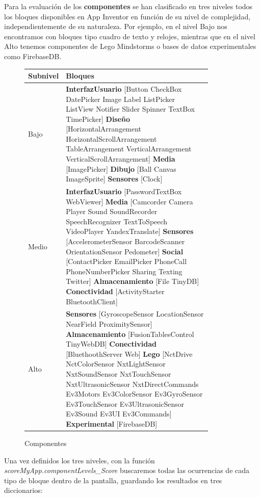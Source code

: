 \documentclass[a4paper, 12pt]{book}
\begin{document}
Para la evaluación de los \textbf{componentes} se han clasificado en tres niveles todos los bloques disponibles en App Inventor en función de su nivel de complejidad, independientemente de su naturaleza. Por ejemplo, en el nivel Bajo nos encontramos con bloques tipo cuadro de texto y relojes, mientras que en el nivel Alto tenemos componentes de Lego Mindstorms o bases de datos experimentales como FirebaseDB. 
\begin{figure}
	\begin{center}
	    \begin{tabular}{| l | p{0.85\linewidth} | }
	    \hline
	    \textbf{Subnivel} & \textbf{Bloques} \\ \hline
		Bajo & \textbf{InterfazUsuario} [Button CheckBox DatePicker Image Label ListPicker ListView Notifier Slider Spinner TextBox TimePicker] \textbf{Diseño} [HorizontalArrangement HorizontalScrollArrangement TableArrangement VerticalArrangement VerticalScrollArrangement] \textbf{Media} [ImagePicker] \textbf{Dibujo} [Ball Canvas ImageSprite] \textbf{Sensores} [Clock] \\ \hline
		Medio & \textbf{InterfazUsuario} [PasswordTextBox WebViewer] \textbf{Media} [Camcorder Camera Player Sound SoundRecorder SpeechRecognizer TextToSpeech VideoPlayer YandexTranslate] \textbf{Sensores} [AccelerometerSensor BarcodeScanner OrientationSensor Pedometer] \textbf{Social} [ContactPicker EmailPicker PhoneCall PhoneNumberPicker Sharing Texting Twitter] \textbf{Almacenamiento} [File TinyDB] \textbf{Conectividad} [ActivityStarter BluetoothClient]\\ \hline
		Alto & \textbf{Sensores} [GyroscopeSensor LocationSensor NearField ProximitySensor] \textbf{Almacenamiento} [FusionTablesControl TinyWebDB] \textbf{Conectividad} [BluethoothServer Web] \textbf{Lego} [NctDrive NctColorSensor NxtLightSensor NxtSoundSensor NxtTouchSensor NxtUltrasonicSensor NxtDirectCommands Ev3Motors Ev3ColorSensor Ev3GyroSensor Ev3TouchSensor Ev3UltrasonicSensor Ev3Sound Ev3UI Ev3Commands] \textbf{Experimental} [FirebaseDB]\\ \hline
            \end{tabular}
	\end{center}
	\caption{Componentes}
	\label{fig:componentsScore}
\end{figure}
Una vez definidos los tres niveles, con la función \textit{scoreMyApp.componentLevels\_Score} buscaremos todas las ocurrencias de cada tipo de bloque dentro de la pantalla, guardando los resultados en tres diccionarios:
\end{document}
